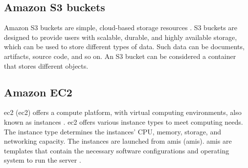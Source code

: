 \subsection{Amazon S3 buckets}
Amazon S3 buckets are simple, cloud-based storage resources \cite{S3Bucket}. S3 buckets are designed to provide users with scalable, durable, and highly available storage, which can be used to store different types of data. Such data can be documents, \gls{artifact}s, source code, and so on. An S3 bucket can be considered a container that stores different objects. 

\subsection{Amazon EC2}
\acrlong{ec2} (\acrshort{ec2}) offers a \gls{compute platform}, with virtual computing environments, also known as instances \cite{awsec2}. \acrshort{ec2} offers various instance types to meet computing needs. The instance type determines the instances' CPU, memory, storage, and networking capacity. The instances are launched from \acrlong{amis} (\acrshort{amis}). \acrshort{amis} are templates that contain the necessary software configurations and operating system to run the server \cite{amis}.